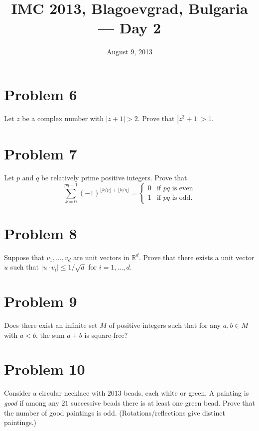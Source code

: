 \documentclass{article}
\title{IMC 2013, Blagoevgrad, Bulgaria --- Day 2}
\date{August 9, 2013}
\begin{document}
\maketitle

\section*{Problem 6}
Let $z$ be a complex number with $|z+1| > 2$. Prove that $|z^3 + 1| > 1$.

\section*{Problem 7}
Let $p$ and $q$ be relatively prime positive integers. Prove that
\[ \sum_{k=0}^{pq-1}(-1)^{\lfloor k/p \rfloor + \lfloor k/q \rfloor} = \begin{cases} 0 & \text{if } pq \text{ is even} \\ 1 & \text{if } pq \text{ is odd.} \end{cases} \]

\section*{Problem 8}
Suppose that $v_1, \dots, v_d$ are unit vectors in $\mathbb{R}^d$. Prove that there exists a unit vector $u$ such that $|u \cdot v_i| \le 1/\sqrt{d}$ for $i = 1, \dots, d$.

\section*{Problem 9}
Does there exist an infinite set $M$ of positive integers such that for any $a, b \in M$ with $a < b$, the sum $a + b$ is square-free?

\section*{Problem 10}
Consider a circular necklace with $2013$ beads, each white or green. A painting is \emph{good} if among any $21$ successive beads there is at least one green bead. Prove that the number of good paintings is odd. (Rotations/reflections give distinct paintings.)
\end{document}
